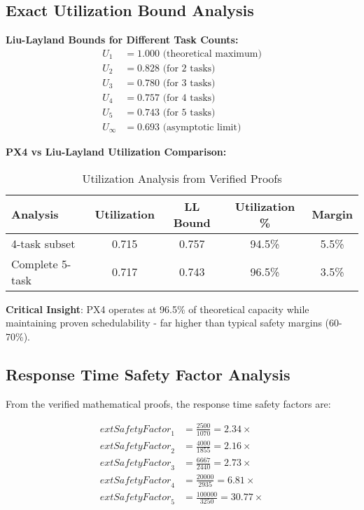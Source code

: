 \documentclass[12pt,a4paper]{article}
\begin{document}
\subsection{Exact Utilization Bound Analysis}

\textbf{Liu-Layland Bounds for Different Task Counts:}
\begin{align}
U_1 &= 1.000 \text{ (theoretical maximum)} \\
U_2 &= 0.828 \text{ (for 2 tasks)} \\
U_3 &= 0.780 \text{ (for 3 tasks)} \\
U_4 &= 0.757 \text{ (for 4 tasks)} \\
U_5 &= 0.743 \text{ (for 5 tasks)} \\
U_\infty &= 0.693 \text{ (asymptotic limit)}
\end{align}

\textbf{PX4 vs Liu-Layland Utilization Comparison:}
\begin{table}[H]
\centering
\begin{tabular}{|l|c|c|c|c|}
\hline
\textbf{Analysis} & \textbf{Utilization} & \textbf{LL Bound} & \textbf{Utilization \%} & \textbf{Margin} \\
\hline
4-task subset & 0.715 & 0.757 & 94.5\% & 5.5\% \\
Complete 5-task & 0.717 & 0.743 & 96.5\% & 3.5\% \\
\hline
\end{tabular}
\caption{Utilization Analysis from Verified Proofs}
\end{table}

\textbf{Critical Insight}: PX4 operates at 96.5\% of theoretical capacity while maintaining proven schedulability - far higher than typical safety margins (60-70\%).

\subsection{Response Time Safety Factor Analysis}

From the verified mathematical proofs, the response time safety factors are:

\begin{align}
	ext{Safety Factor}_1 &= \frac{2500}{1070} = 2.34\times \\
	ext{Safety Factor}_2 &= \frac{4000}{1855} = 2.16\times \\
	ext{Safety Factor}_3 &= \frac{6667}{2440} = 2.73\times \\
	ext{Safety Factor}_4 &= \frac{20000}{2935} = 6.81\times \\
	ext{Safety Factor}_5 &= \frac{100000}{3250} = 30.77\times
\end{align}
\end{document}
